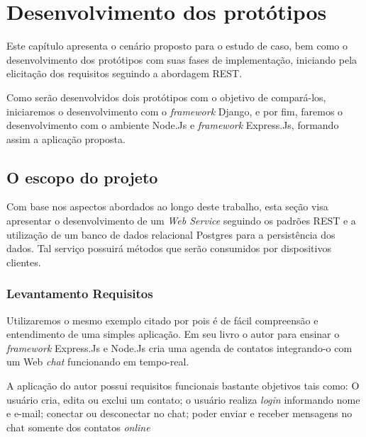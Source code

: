 
\chapter{Desenvolvimento dos protótipos}
\label{desenvolvimento-prototipos}

\vspace{-1.9cm}


  Este capítulo apresenta o cenário proposto para o estudo de caso, bem
  como o desenvolvimento dos protótipos com suas fases de implementação, iniciando
  pela elicitação dos requisitos seguindo a abordagem \ac{REST}.
  
  Como serão desenvolvidos dois protótipos com o objetivo de compará-los, iniciaremos o desenvolvimento com o \textit{framework} Django, e por fim, faremos o desenvolvimento
  com o ambiente Node.Js e \textit{framework} Express.Js, formando assim a aplicação proposta.
  
\section{O escopo do projeto}
\label{escopo-projeto}

  Com base nos aspectos abordados ao longo deste trabalho, 
  esta seção visa apresentar o desenvolvimento de um \textit{Web Service} seguindo os padrões \ac{REST} e a utilização 
  de um banco de dados relacional Postgres para a persistência dos dados.  
  Tal serviço possuirá métodos que serão consumidos por dispositivos clientes.

\subsection{Levantamento Requisitos}
\label{levantamento-requisitos}

  Utilizaremos o mesmo exemplo citado por  pois é de fácil compreensão
  e entendimento de uma simples aplicação. Em seu livro o autor para ensinar o \textit{framework}
  Express.Js e Node.Js cria uma agenda de contatos integrando-o com um Web \textit{chat} funcionando em tempo-real.
  
  A aplicação do autor possui requisitos funcionais bastante objetivos tais como: O usuário cria, edita ou exclui um contato; 
  o usuário realiza \textit{login} informando nome e e-mail; conectar ou desconectar no chat; poder enviar e receber mensagens no chat somente
  dos contatos \textit{online}
  
